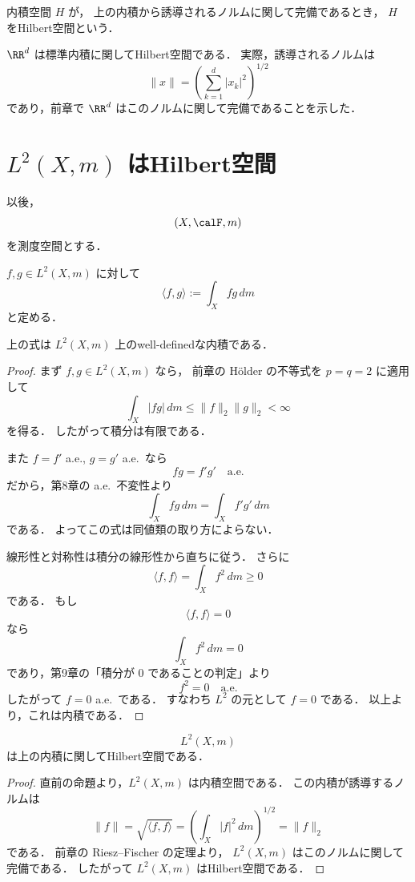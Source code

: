 \begin{definition}[Hilbert空間]
内積空間 $H$ が，
上の内積から誘導されるノルムに関して完備であるとき，
$H$ をHilbert空間という．
\end{definition}

\begin{example}
$\RR^d$ は標準内積に関してHilbert空間である．
実際，誘導されるノルムは
\[
\|x\|=\left(\sum_{k=1}^d |x_k|^2\right)^{1/2}
\]
であり，前章で $\RR^d$ はこのノルムに関して完備であることを示した．
\end{example}

\section{\texorpdfstring{$L^2(X,m)$}{L2(X,m)} はHilbert空間}

以後，
\[
(X,\calF,m)
\]
を測度空間とする．

\begin{definition}
$f,g\in L^2(X,m)$ に対して
\[
\langle f,g\rangle:=\int_X f g\,dm
\]
と定める．
\end{definition}

\begin{proposition}
上の式は $L^2(X,m)$ 上のwell-definedな内積である．
\end{proposition}
\begin{proof}
まず $f,g\in L^2(X,m)$ なら，
前章の Hölder の不等式を $p=q=2$ に適用して
\[
\int_X |fg|\,dm\le \|f\|_2\|g\|_2<\infty
\]
を得る．
したがって積分は有限である．

また $f=f'$ a.e., $g=g'$ a.e.\ なら
\[
fg=f'g' \quad \text{a.e.}
\]
だから，第8章の a.e.\ 不変性より
\[
\int_X fg\,dm=\int_X f'g'\,dm
\]
である．
よってこの式は同値類の取り方によらない．

線形性と対称性は積分の線形性から直ちに従う．
さらに
\[
\langle f,f\rangle=\int_X f^2\,dm\ge 0
\]
である．
もし
\[
\langle f,f\rangle=0
\]
なら
\[
\int_X f^2\,dm=0
\]
であり，第9章の「積分が $0$ であることの判定」より
\[
f^2=0 \quad \text{a.e.}
\]
したがって $f=0$ a.e.\ である．
すなわち $L^2$ の元として $f=0$ である．
以上より，これは内積である．
\end{proof}

\begin{theorem}
\[
L^2(X,m)
\]
は上の内積に関してHilbert空間である．
\end{theorem}
\begin{proof}
直前の命題より，$L^2(X,m)$ は内積空間である．
この内積が誘導するノルムは
\[
\|f\|=\sqrt{\langle f,f\rangle}
=
\left(\int_X |f|^2\,dm\right)^{1/2}
=
\|f\|_2
\]
である．
前章の Riesz--Fischer の定理より，
$L^2(X,m)$ はこのノルムに関して完備である．
したがって $L^2(X,m)$ はHilbert空間である．
\end{proof}

